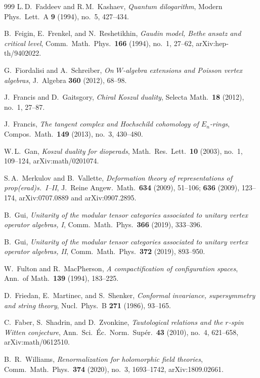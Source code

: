 \documentclass[11pt]{memoir}
\begin{document}
\begin{thebibliography}{999}
 L.\,D.~Faddeev and R.\,M.~Kashaev, \emph{Quantum dilogarithm}, Modern Phys.\ Lett.~A \textbf{9} (1994), no.~5, 427--434.

 B.~Feigin, E.~Frenkel, and N.~Reshetikhin, \emph{Gaudin model, Bethe ansatz and critical level}, Comm.\ Math.\ Phys.\ \textbf{166} (1994), no.~1, 27--62, arXiv:hep-th/9402022.

 G.~Fiordalisi and A.~Schreiber, \emph{On $W$-algebra extensions and Poisson vertex algebras}, J.\ Algebra \textbf{360} (2012), 68--98.

 J.~Francis and D.~Gaitsgory, \emph{Chiral Koszul duality}, Selecta Math.\ \textbf{18} (2012), no.~1, 27--87.

 J.~Francis, \emph{The tangent complex and Hochschild cohomology of $E_n$-rings}, Compos.\ Math.\ \textbf{149} (2013), no.~3, 430--480.

 W.\,L.~Gan, \emph{Koszul duality for dioperads}, Math.\ Res.\ Lett.\ \textbf{10} (2003), no.~1, 109--124, arXiv:math/0201074.

 S.\,A.~Merkulov and B.~Vallette, \emph{Deformation theory of representations of prop(erad)s.\ I--II}, J.\ Reine Angew.\ Math.\ \textbf{634} (2009), 51--106; \textbf{636} (2009), 123--174, arXiv:0707.0889 and arXiv:0907.2895.

 B.~Gui, \emph{Unitarity of the modular tensor categories associated to unitary vertex operator algebras, I}, Comm.\ Math.\ Phys.\ \textbf{366} (2019), 333--396.

 B.~Gui, \emph{Unitarity of the modular tensor categories associated to unitary vertex operator algebras, II}, Comm.\ Math.\ Phys.\ \textbf{372} (2019), 893--950.

 W.~Fulton and R.~MacPherson, \emph{A compactification of configuration spaces}, Ann.\ of Math.\ \textbf{139} (1994), 183--225.

 D.~Friedan, E.~Martinec, and S.~Shenker, \emph{Conformal invariance, supersymmetry and string theory}, Nucl.\ Phys.\ B \textbf{271} (1986), 93--165.

 C.~Faber, S.~Shadrin, and D.~Zvonkine, \emph{Tautological relations and the $r$-spin Witten conjecture}, Ann.\ Sci.\ \'Ec.\ Norm.\ Sup\'er.\ \textbf{43} (2010), no.~4, 621--658, arXiv:math/0612510.

 B.~R.~Williams, \emph{Renormalization for holomorphic field theories}, Comm.\ Math.\ Phys.\ \textbf{374} (2020), no.~3, 1693--1742, arXiv:1809.02661.


\end{thebibliography}
\end{document}

